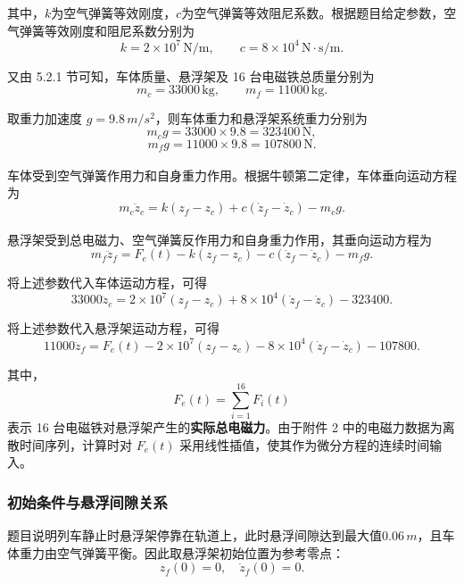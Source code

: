 \documentclass[a4paper]{nmmcm}
\newcommand{\upcite}[1]{\textsuperscript{\cite{#1}}}
\begin{document}
其中，$k$为空气弹簧等效刚度，$c$为空气弹簧等效阻尼系数。根据题目给定参数，空气弹簧等效刚度和阻尼系数分别为
\[
k=2\times10^7\,\mathrm{N/m},
\qquad
c=8\times10^4\,\mathrm{N\cdot s/m}.
\]

又由 5.2.1 节可知，车体质量、悬浮架及 16 台电磁铁总质量分别为
\[
m_c=33000\,\mathrm{kg},
\qquad
m_f=11000\,\mathrm{kg}.
\]

取重力加速度 $g=9.8\,m/s^2$，则车体重力和悬浮架系统重力分别为
\[
m_cg=33000\times9.8=323400\,\mathrm{N},
\]
\[
m_fg=11000\times9.8=107800\,\mathrm{N}.
\]

车体受到空气弹簧作用力和自身重力作用。根据牛顿第二定律\upcite{5}，车体垂向运动方程为
\begin{equation}
m_c\ddot{z}_c=k(z_f-z_c)+c(\dot{z}_f-\dot{z}_c)-m_cg.
\end{equation}

悬浮架受到总电磁力、空气弹簧反作用力和自身重力作用\upcite{6}，其垂向运动方程为
\begin{equation}
m_f\ddot{z}_f=F_e(t)-k(z_f-z_c)-c(\dot{z}_f-\dot{z}_c)-m_fg.
\end{equation}

将上述参数代入车体运动方程，可得
\begin{equation}
33000\ddot{z}_c
=2\times10^7(z_f-z_c)+8\times10^4(\dot{z}_f-\dot{z}_c)-323400.
\end{equation}

将上述参数代入悬浮架运动方程，可得
\begin{equation}
11000\ddot{z}_f
=F_e(t)-2\times10^7(z_f-z_c)-8\times10^4(\dot{z}_f-\dot{z}_c)-107800.
\end{equation}

其中，
\begin{equation}
F_e(t)=\sum_{i=1}^{16}F_i(t)
\end{equation}
表示 16 台电磁铁对悬浮架产生的\textbf{实际总电磁力}。由于附件 2 中的电磁力数据为离散时间序列，计算时对 $F_e(t)$ 采用线性插值，使其作为微分方程的连续时间输入。

\subsubsection{初始条件与悬浮间隙关系}

题目说明列车静止时悬浮架停靠在轨道上，此时悬浮间隙达到最大值$0.06\,m$，且车体重力由空气弹簧平衡。因此取悬浮架初始位置为参考零点：
\begin{equation}
z_f(0)=0,\quad \dot{z}_f(0)=0.
\end{equation}
\end{document}
